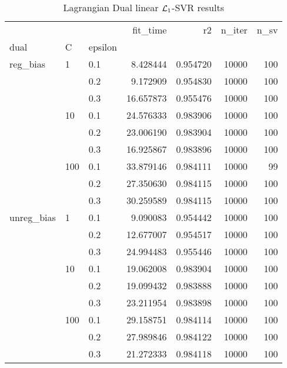\begin{table}[H]
\centering
\caption{Lagrangian Dual linear $\protect \mathcal{L}_1$-SVR results}
\label{linear_lagrangian_dual_l1_svr_cv_results}
\begin{tabular}{lllrrrr}
\toprule
           &     &     &   fit\_time &        r2 &  n\_iter &  n\_sv \\
dual & C & epsilon &            &           &         &       \\
\midrule
reg\_bias & 1   & 0.1 &   8.428444 &  0.954720 &   10000 &   100 \\
           &     & 0.2 &   9.172909 &  0.954830 &   10000 &   100 \\
           &     & 0.3 &  16.657873 &  0.955476 &   10000 &   100 \\
           & 10  & 0.1 &  24.576333 &  0.983906 &   10000 &   100 \\
           &     & 0.2 &  23.006190 &  0.983904 &   10000 &   100 \\
           &     & 0.3 &  16.925867 &  0.983896 &   10000 &   100 \\
           & 100 & 0.1 &  33.879146 &  0.984111 &   10000 &    99 \\
           &     & 0.2 &  27.350630 &  0.984115 &   10000 &   100 \\
           &     & 0.3 &  30.259589 &  0.984115 &   10000 &   100 \\
unreg\_bias & 1   & 0.1 &   9.090083 &  0.954442 &   10000 &   100 \\
           &     & 0.2 &  12.677007 &  0.954517 &   10000 &   100 \\
           &     & 0.3 &  24.994483 &  0.955446 &   10000 &   100 \\
           & 10  & 0.1 &  19.062008 &  0.983904 &   10000 &   100 \\
           &     & 0.2 &  19.099432 &  0.983888 &   10000 &   100 \\
           &     & 0.3 &  23.211954 &  0.983898 &   10000 &   100 \\
           & 100 & 0.1 &  29.158751 &  0.984114 &   10000 &   100 \\
           &     & 0.2 &  27.989846 &  0.984122 &   10000 &   100 \\
           &     & 0.3 &  21.272333 &  0.984118 &   10000 &   100 \\
\bottomrule
\end{tabular}
\end{table}
